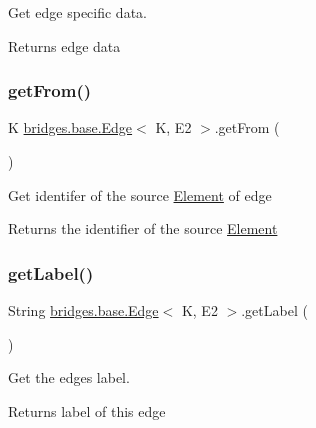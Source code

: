 Get edge specific data.

\begin{DoxyReturn}{Returns}
edge data 
\end{DoxyReturn}
\mbox{\label{classbridges_1_1base_1_1_edge_afc23a7c2ee8ab4c4f0950c9bf25edd56}} 
\subsubsection{\texorpdfstring{get\+From()}{getFrom()}}
{\footnotesize\ttfamily K \mbox{\hyperlink{classbridges_1_1base_1_1_edge}{bridges.\+base.\+Edge}}$<$ K, E2 $>$.get\+From (\begin{DoxyParamCaption}{ }\end{DoxyParamCaption})}

Get identifer of the source \mbox{\hyperlink{classbridges_1_1base_1_1_element}{Element}} of edge

\begin{DoxyReturn}{Returns}
the identifier of the source \mbox{\hyperlink{classbridges_1_1base_1_1_element}{Element}} 
\end{DoxyReturn}
\mbox{\label{classbridges_1_1base_1_1_edge_a8663708d930e8df460c57d8bdbab44b2}} 
\subsubsection{\texorpdfstring{get\+Label()}{getLabel()}}
{\footnotesize\ttfamily String \mbox{\hyperlink{classbridges_1_1base_1_1_edge}{bridges.\+base.\+Edge}}$<$ K, E2 $>$.get\+Label (\begin{DoxyParamCaption}{ }\end{DoxyParamCaption})}



Get the edge\textquotesingle{}s label. 

\begin{DoxyReturn}{Returns}
label of this edge 
\end{DoxyReturn}
\mbox{\label{classbridges_1_1base_1_1_edge_a11c655622b8a54f2931f59b1d256f84a}} 
